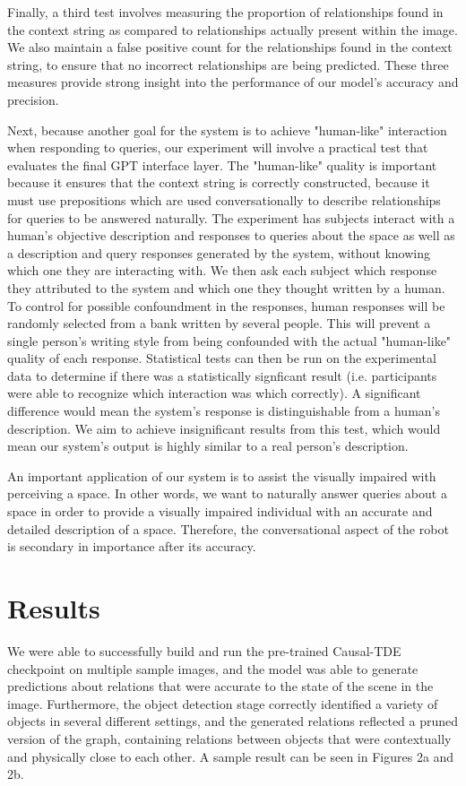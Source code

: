 \documentclass[letterpaper, 10 pt, conference]{ieeeconf}  %
\begin{document}
    Finally, a third test involves measuring the proportion of relationships found in the context string as compared to relationships actually present within the image. We also maintain a false positive count for the relationships found in the context string, to ensure that no incorrect relationships are being predicted. These three measures provide strong insight into the performance of our model's accuracy and precision.

    Next, because another goal for the system is to achieve "human-like" interaction when responding to queries, our experiment will involve a practical test that evaluates the final GPT interface layer. The "human-like" quality is important because it ensures that the context string is correctly constructed, because it must use prepositions which are used conversationally to describe relationships for queries to be answered naturally. The experiment has subjects interact with a human's objective description and responses to queries about the space as well as a description and query responses generated by the system, without knowing which one they are interacting with. We then ask each subject which response they attributed to the system and which one they thought written by a human. To control for possible confoundment in the responses, human responses will be randomly selected from a bank written by several people. This will prevent a single person's writing style from being confounded with the actual "human-like" quality of each response. Statistical tests can then be run on the experimental data to determine if there was a statistically signficant result (i.e. participants were able to recognize which interaction was which correctly). A significant difference would mean the system's response is distinguishable from a human's description. We aim to achieve insignificant results from this test, which would mean our system's output is highly similar to a real person's description.

    An important application of our system is to assist the visually impaired with perceiving a space. In other words, we want to naturally answer queries about a space in order to provide a visually impaired individual with an accurate and detailed description of a space. Therefore, the conversational aspect of the robot is secondary in importance after its accuracy.


\section{Results}
    We were able to successfully build and run the pre-trained Causal-TDE checkpoint on multiple sample images, and the model was able to generate predictions about relations that were accurate to the state of the scene in the image. Furthermore, the object detection stage correctly identified a variety of objects in several different settings, and the generated relations reflected a pruned version of the graph, containing relations between objects that were contextually and physically close to each other. A sample result can be seen in Figures 2a and 2b.
\end{document}
